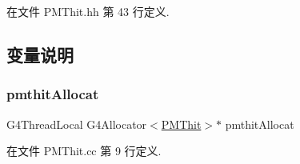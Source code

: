在文件 P\+M\+Thit.\+hh 第 43 行定义.



\subsection{变量说明}
\mbox{\label{PMThit_8hh_a71f7d386761191d5c1d7f380ac9abd52}} 
\subsubsection{\texorpdfstring{pmthit\+Allocat}{pmthitAllocat}}
{\footnotesize\ttfamily G4\+Thread\+Local G4\+Allocator$<$\hyperlink{classPMThit}{P\+M\+Thit}$>$$\ast$ pmthit\+Allocat}



在文件 P\+M\+Thit.\+cc 第 9 行定义.


